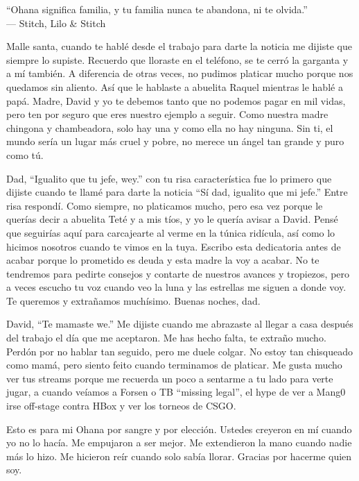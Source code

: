 \begin{frontmatter}[Dedication]
    \centering
    ``Ohana significa familia, y tu familia nunca te abandona, ni te olvida.''\\
    --- Stitch, Lilo \& Stitch

    \justify
    Malle santa, cuando te hablé desde el trabajo para darte la noticia me dijiste que siempre lo supiste. Recuerdo que lloraste en el teléfono, se te cerró la garganta y a mí también. A diferencia de otras veces, no pudimos platicar mucho porque nos quedamos sin aliento. Así que le hablaste a abuelita Raquel mientras le hablé a papá. Madre, David y yo te debemos tanto que no podemos pagar en mil vidas, pero ten por seguro que eres nuestro ejemplo a seguir. Como nuestra madre chingona y chambeadora, solo hay una y como ella no hay ninguna. Sin ti, el mundo sería un lugar más cruel y pobre, no merece un ángel tan grande y puro como tú.

    Dad, ``Igualito que tu jefe, wey.'' con tu risa característica fue lo primero que dijiste cuando te llamé para darte la noticia ``Sí dad, igualito que mi jefe.'' Entre risa respondí. Como siempre, no platicamos mucho, pero esa vez porque le querías decir a abuelita Teté y a mis tíos, y yo le quería avisar a David. Pensé que seguirías aquí para carcajearte al verme en la túnica ridícula, así como lo hicimos nosotros cuando te vimos en la tuya. Escribo esta dedicatoria antes de acabar porque lo prometido es deuda y esta madre la voy a acabar. No te tendremos para pedirte consejos y contarte de nuestros avances y tropiezos, pero a veces escucho tu voz cuando veo la luna y las estrellas me siguen a donde voy. Te queremos y extrañamos muchísimo. Buenas noches, dad.

    David, ``Te mamaste we.'' Me dijiste cuando me abrazaste al llegar a casa después del trabajo el día que me aceptaron. Me has hecho falta, te extraño mucho. Perdón por no hablar tan seguido, pero me duele colgar. No estoy tan chisqueado como mamá, pero siento feito cuando terminamos de platicar. Me gusta mucho ver tus streams porque me recuerda un poco a sentarme a tu lado para verte jugar, a cuando veíamos a Forsen o TB ``missing legal'', el hype de ver a Mang0 irse off-stage contra HBox y ver los torneos de CSGO.

    Esto es para mi Ohana por sangre y por elección. Ustedes creyeron en mí cuando yo no lo hacía. Me empujaron a ser mejor. Me extendieron la mano cuando nadie más lo hizo. Me hicieron reír cuando solo sabía llorar. Gracias por hacerme quien soy.
\end{frontmatter}

